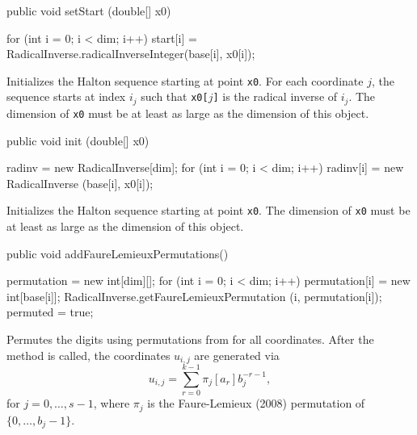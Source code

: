 \begin{code}

   public void setStart (double[] x0) \begin{hide} {
      for (int i = 0; i < dim; i++)
         start[i] = RadicalInverse.radicalInverseInteger(base[i], x0[i]);
   }\end{hide}
\end{code}
 \begin{tabb}
   Initializes the Halton sequence starting at point \texttt{x0}.
   For each coordinate $j$, the sequence starts at index $i_j$ such that 
   \texttt{x0[$j$]} is the radical inverse of $i_j$.
   The dimension of \texttt{x0} must be at least as large as the dimension
   of this object.
 \end{tabb}
\begin{htmlonly}
\end{htmlonly}
\begin{code}

   public void init (double[] x0) \begin{hide} {
      radinv = new RadicalInverse[dim];
      for (int i = 0; i < dim; i++)
         radinv[i] = new RadicalInverse (base[i], x0[i]);
   }\end{hide}
\end{code}
 \begin{tabb}
   Initializes the Halton sequence starting at point \texttt{x0}.
   The dimension of \texttt{x0} must be at least as large as the dimension
   of this object.
 \end{tabb}
\begin{htmlonly}
\end{htmlonly}
\begin{code}

   public void addFaureLemieuxPermutations()\begin{hide} {
      permutation = new int[dim][];
      for (int i = 0; i < dim; i++) {
         permutation[i] = new int[base[i]];
         RadicalInverse.getFaureLemieuxPermutation (i, permutation[i]);
      }
      permuted = true;
   }
\end{hide}
\end{code}
 \begin{tabb}
Permutes the digits using permutations from \cite{vFAU09a} for all coordinates.
After the method is called, the coordinates $u_{i,j}$ are generated via
\[
  u_{i,j} = \sum_{r=0}^{k-1} \pi_j[a_r] b_j^{-r-1},
\]
 for $j=0,\dots,s-1$,
 where $\pi_j$ is the Faure-Lemieux (2008) permutation of $\{0,\dots,b_j-1\}$.
 \end{tabb}
